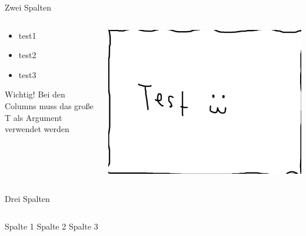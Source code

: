 \documentclass[ngerman,14pt,aspectratio=1610]{beamer}
\begin{document}
	
	\begin{frame}[t]{Zwei Spalten} \vspace{10pt}
		\begin{columns}[T, onlytextwidth]
			\begin{column}{0.45\textwidth}
				\begin{itemize}
					\item test1
					\item test2
					\item test3
				\end{itemize}
				\begin{block}{Wichtig!}
				Bei den Columns muss das große T als Argument verwendet werden
				\end{block}
			\end{column}
			
			\begin{column}{0.45\textwidth}
				\includegraphics[width=\linewidth]{testbild}
			\end{column}
		\end{columns}
	\end{frame}

		
	\begin{frame}[t]{Drei Spalten} \vspace{10pt}
		\begin{columns}[onlytextwidth]
			Spalte 1
			Spalte 2
			Spalte 3
		\end{columns}
	\end{frame}
	
\end{document}
